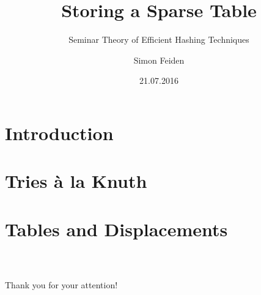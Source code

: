 \documentclass{beamer}
\title{Storing a Sparse Table}
\subtitle{Seminar Theory of Efficient Hashing Techniques}
\date{21.07.2016}
\author{Simon Feiden}
\begin{document}
	
	
\maketitle

\begin{frame}
	\tableofcontents
\end{frame}


\section{Introduction}



\section{Tries à la Knuth}



\section{Tables and Displacements}




\begin{frame}
	\frametitle{\ }
	\begin{center}
		\LARGE Thank you for your attention!
	\end{center}
\end{frame}


\begin{frame}
\end{frame}







\end{document}
